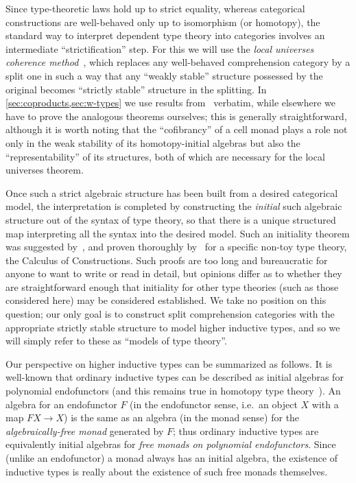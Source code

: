 \begin{rmk}
  Since type-theoretic laws hold up to strict equality, whereas categorical constructions are well-behaved only up to isomorphism (or homotopy), the standard way to interpret dependent type theory into categories involves an intermediate ``strictification'' step.
  For this we will use the \emph{local universes coherence method}~\cite{lw:localuniv}, which replaces any well-behaved comprehension category by a split one in such a way that any ``weakly stable'' structure possessed by the original becomes ``strictly stable'' structure in the splitting.
  In \cref{sec:coproducts,sec:w-types} we use results from~\cite{lw:localuniv} verbatim, while elsewhere we have to prove the analogous theorems ourselves; this is generally straightforward, although it is worth noting that the ``cofibrancy'' of a cell monad plays a role not only in the weak stability of its homotopy-initial algebras but also the ``representability'' of its structures, both of which are necessary for the local universes theorem.

  Once such a strict algebraic structure has been built from a desired categorical model, the interpretation is completed by constructing the \emph{initial} such algebraic structure out of the syntax of type theory, so that there is a unique structured map interpreting all the syntax into the desired model.
  Such an initiality theorem was suggested by~\cite{cartmell:gatcc}, and proven thoroughly by~\cite{streicher:semtt} for a specific non-toy type theory, the Calculus of Constructions.
  Such proofs are too long and bureaucratic for anyone to want to write or read in detail, but opinions differ as to whether they are straightforward enough that initiality for other type theories (such as those considered here) may be considered established.
  We take no position on this question; our only goal is to construct split comprehension categories with the appropriate strictly stable structure to model higher inductive types, and so we will simply refer to these as ``models of type theory''.
\end{rmk}

Our perspective on higher inductive types can be summarized as follows.
It is well-known that ordinary inductive types can be described as initial algebras for polynomial endofunctors (and this remains true in homotopy type theory~\cite{ags:it-hott}).
An algebra for an endofunctor $F$ (in the endofunctor sense, i.e.\ an object $X$ with a map $F X \to X$) is the same as an algebra (in the monad sense) for the \emph{algebraically-free monad} generated by $F$; thus ordinary inductive types are equivalently initial algebras for \emph{free monads on polynomial endofunctors}.
Since (unlike an endofunctor) a monad always has an initial algebra, the existence of inductive types is really about the existence of such free monads themselves.

